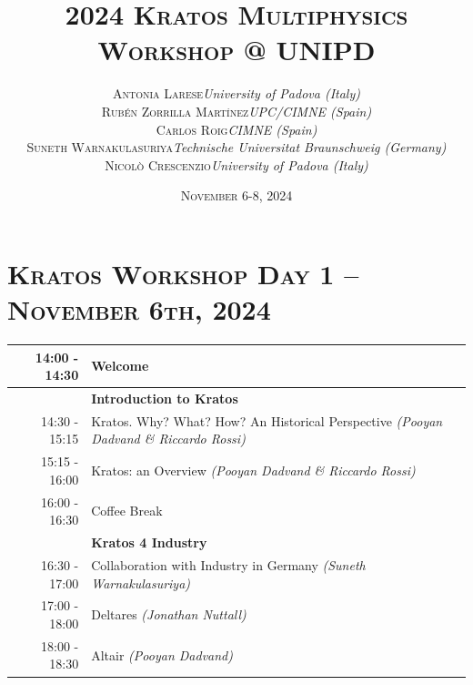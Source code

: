 \documentclass{article}
\begin{document}
\title{
   \Huge
   2024 \textsc{Kratos Multiphysics\\Workshop @ UNIPD}
}
\author{
   \small
   \begin{tabular}{rl}
      \textsc{Antonia Larese} & \textit{University of Padova (Italy)} \\
      \textsc{Rubén Zorrilla Martínez} & \textit{UPC/CIMNE (Spain)} \\
      \textsc{Carlos Roig} & \textit{CIMNE (Spain)} \\
      \textsc{Suneth Warnakulasuriya} & \textit{Technische Universitat Braunschweig (Germany)} \\
      \textsc{Nicol\`o Crescenzio} & \textit{University of Padova (Italy)}
   \end{tabular}
}
\date{\textsc{November} 6-8, 2024}
\maketitle

\renewcommand{\arraystretch}{1.5}

\section*{\centering\textsc{Kratos Workshop Day 1 -- November 6th, 2024}}

\begin{table}[h]\centering
   \begin{tabularx}{0.85\textwidth}{r|X}
      \toprule%
      14:00 - 14:30 & Welcome \\%
      \midrule%
                    & {\large \textbf{Introduction to Kratos}} \\%
      14:30 - 15:15 & Kratos. Why? What? How? An Historical Perspective \textit{(Pooyan Dadvand \& Riccardo Rossi)}\\%
      15:15 - 16:00 & Kratos: an Overview \textit{(Pooyan Dadvand \& Riccardo Rossi)}\\%
      \midrule%
      \rowcolor{SeaGreen3!5!} 16:00 - 16:30 & Coffee Break \\%
      \midrule%
                    & {\large \textbf{Kratos 4 Industry}} \\%
      16:30 - 17:00 & Collaboration with Industry in Germany \textit{(Suneth Warnakulasuriya)}\\%
      17:00 - 18:00 & Deltares \textit{(Jonathan Nuttall)}\\%
      18:00 - 18:30 & Altair \textit{(Pooyan Dadvand)}\\%
      \bottomrule
   \end{tabularx}
\end{table}
\end{document}
